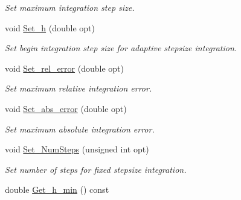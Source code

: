 \begin{DoxyCompactItemize}
\begin{DoxyCompactList}\small\item\em Set maximum integration step size. \end{DoxyCompactList}\item 
void \hyperlink{structcudanusquids_1_1ParameterObject_a45db70e810f817409db10d29937ebb84}{Set\+\_\+h} (double opt)\hypertarget{structcudanusquids_1_1ParameterObject_a45db70e810f817409db10d29937ebb84}{}\label{structcudanusquids_1_1ParameterObject_a45db70e810f817409db10d29937ebb84}

\begin{DoxyCompactList}\small\item\em Set begin integration step size for adaptive stepsize integration. \end{DoxyCompactList}\item 
void \hyperlink{structcudanusquids_1_1ParameterObject_abb5a1fd8843e40a071dd06cc5e200258}{Set\+\_\+rel\+\_\+error} (double opt)\hypertarget{structcudanusquids_1_1ParameterObject_abb5a1fd8843e40a071dd06cc5e200258}{}\label{structcudanusquids_1_1ParameterObject_abb5a1fd8843e40a071dd06cc5e200258}

\begin{DoxyCompactList}\small\item\em Set maximum relative integration error. \end{DoxyCompactList}\item 
void \hyperlink{structcudanusquids_1_1ParameterObject_a92d70356bfb68e0b7d162941b1ed74e0}{Set\+\_\+abs\+\_\+error} (double opt)\hypertarget{structcudanusquids_1_1ParameterObject_a92d70356bfb68e0b7d162941b1ed74e0}{}\label{structcudanusquids_1_1ParameterObject_a92d70356bfb68e0b7d162941b1ed74e0}

\begin{DoxyCompactList}\small\item\em Set maximum absolute integration error. \end{DoxyCompactList}\item 
void \hyperlink{structcudanusquids_1_1ParameterObject_a36ac77ff1ade922fee3716a6ae6fa4a3}{Set\+\_\+\+Num\+Steps} (unsigned int opt)\hypertarget{structcudanusquids_1_1ParameterObject_a36ac77ff1ade922fee3716a6ae6fa4a3}{}\label{structcudanusquids_1_1ParameterObject_a36ac77ff1ade922fee3716a6ae6fa4a3}

\begin{DoxyCompactList}\small\item\em Set number of steps for fixed stepsize integration. \end{DoxyCompactList}\item 
double \hyperlink{structcudanusquids_1_1ParameterObject_a9ae7f77fa2e0a1fc3103cca02993ba3d}{Get\+\_\+h\+\_\+min} () const \hypertarget{structcudanusquids_1_1ParameterObject_a9ae7f77fa2e0a1fc3103cca02993ba3d}{}\label{structcudanusquids_1_1ParameterObject_a9ae7f77fa2e0a1fc3103cca02993ba3d}


\end{DoxyCompactItemize}
